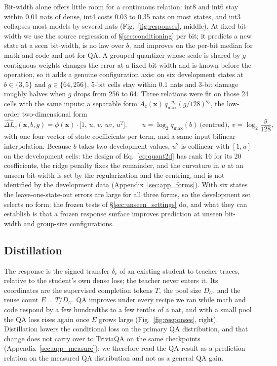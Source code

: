 Bit-width alone offers little room for a continuous relation: int8
and int6 stay within 0.01 nats of dense, int4 costs 0.03 to 0.35 nats
on most states, and int3 collapses most models by several nats
(Fig.~\ref{fig:responses}, middle). At fixed bit-width we use the
source regression of \S\ref{sec:conditioning} per bit; it predicts a
new state at a seen bit-width, is no law over $b$, and improves on the
per-bit median for math and code and not for QA. A grouped quantizer
whose scale is shared by $g$ contiguous weights changes the error at
a fixed bit-width and is known before the operation, so it adds a
genuine configuration axis: on six development states at
$b\in\{3,5\}$ and $g\in\{64,256\}$, 5-bit cells stay within 0.1 nats
and 3-bit damage roughly halves when $g$ drops from 256 to 64. Three
relations were fit on those 24 cells with the same inputs: a separable form
$A_c(\mathbf x)\,q_{\max}^{-p_c}(g/128)^{q_c}$, the low-order
two-dimensional form
\begin{equation}
\widehat{\Delta L}_c(\mathbf x,b,g)=\phi(\mathbf x)\cdot\big[1,\,u,\,v,\,uv,\,u^2\big],
\qquad u=\log_2 q_{\max}(b)\ \text{(centred)},\ v=\log_2\frac{g}{128},
\label{eq:quant2d}
\end{equation}
with one four-vector of state coefficients per term, and a same-input
bilinear interpolation. Because $b$ takes two development values,
$u^2$ is collinear with $[1,u]$ on the development cells: the design
of Eq.~\eqref{eq:quant2d} has rank 16 for its 20 coefficients, the ridge penalty fixes the remainder, and the curvature in $u$ at an
unseen bit-width is set by the regularization and the centring, and
is not identified by the development data
(Appendix~\ref{sec:app_forms}). With six states the leave-one-state-out
errors are large for all three forms, so the development set selects
no form; the frozen tests of \S\ref{sec:unseen_settings} do, and what
they can establish is that a frozen response surface improves
prediction at unseen bit-width and group-size configurations.

\subsection{Distillation}
\label{sec:law_distill}

The response is the signed transfer $\delta_c$ of an existing student
to teacher traces, relative to the student's own dense loss; the
teacher never enters it. Its coordinates are the supervised
completion tokens $T$, the pool size $D_U$, and the reuse count
$E=T/D_U$. QA improves under every recipe we ran while math and code
respond by a few hundredths to a few tenths of a nat, and with a small
pool the QA loss rises again once $E$ grows large
(Fig.~\ref{fig:responses}, right). Distillation lowers the
conditional loss on the primary QA distribution, and that change does
not carry over to TriviaQA on the same checkpoints
(Appendix~\ref{sec:app_measure}); we therefore read the QA result as
a prediction relation on the measured QA distribution and not as a
general QA gain.

